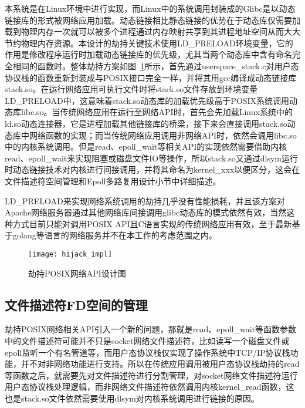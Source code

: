 本系统是在Linux环境中进行实现，而Linux中的系统调用封装成的Glibc是以动态链接库的形式被网络应用加载。动态链接相比静态链接的优势在于动态库仅需要加载到物理内存一次就可以被多个进程通过内存映射共享到其进程地址空间从而大大节约物理内存资源。本设计的劫持关键技术使用LD\_PRELOAD环境变量，它的作用是修改程序运行时加载动态链接库的优先级，尤其当两个动态库中含有命名完全相同的函数时。整体劫持方案如图~\ref{fig:hijack_impl}所示，首先通过userspace\_stack.c对用户态协议栈的函数重新封装成与POSIX接口完全一样，并将其用gcc编译成动态链接库stack.so。在运行网络应用可执行文件时将stack.so文件存放到环境变量LD\_PRELOAD中，这意味着stack.so动态库的加载优先级高于POSIX系统调用动态库libc.so。当传统网络应用在运行至网络API时，首先会先加载Linux系统中的ld.so动态连接器，它是进程加载其他链接库的桥梁，接下来会直接调用stack.so动态库中网络函数的实现；而当传统网络应用调用非网络API时，依然会调用libc.so中的内核系统调用。但是read、epoll\_wait等相关API的实现依然需要借助内核read、epoll\_wait来实现阻塞或磁盘文件IO等操作，所以stack.so又通过dlsym运行时动态链接技术对内核进行间接调用，并将其命名为kernel\_xxx以便区分，这会在文件描述符空间管理和Epoll多路复用设计小节中详细描述。

LD\_PRELOAD来实现网络系统调用的劫持几乎没有性能损耗，并且该方案对Apache网络服务器通过其他网络库间接调用glibc动态库的模式依然有效，当然这种方式目前只能对调用POSIX API且C语言实现的传统网络应用有效，至于最新基于golang等语言的网络服务并不在本工作的考虑范围之内。

\vspace{-10pt}
\begin{figure}[H] %
  \centering
  \texttt{[image: hijack\_impl]}
  \caption{劫持POSIX网络API设计图}
  \label{fig:hijack_impl}
\end{figure}
\vspace{-10pt}

\subsection{文件描述符FD空间的管理}

劫持POSIX网络相关API引入一个新的问题，那就是read、epoll\_wait等函数参数中的文件描述符可能并不只是socket网络文件描述符，比如读写一个磁盘文件或epoll监听一个有名管道等，而用户态协议栈仅实现了操作系统中TCP/IP协议栈功能，并不对非网络功能进行支持。所以在传统应用调用被用户态协议栈劫持的read等函数之后，就需要先对文件描述符进行分割管理，对socket网络文件描述符运行用户态协议栈处理逻辑，而非网络文件描述符依然调用内核kernel\_read函数，这也是stack.so文件依然需要使用dlsym对内核系统调用进行链接的原因。

